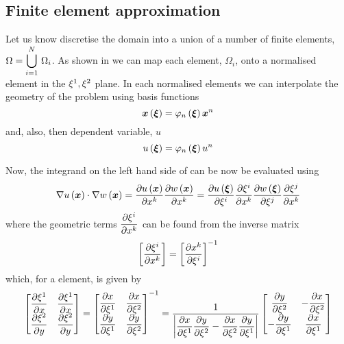 \subsection{Finite element approximation}
\label{subsec:FEMTwoDLaplaceFiniteElementApproximation}

Let us know discretise the domain into a union of a number of finite
elements, $\Omega =   \displaystyle\bigcup _{i=1}^{N}\,\Omega_{i} $. As shown in
 we can map each element, $\Omega_{i}$, onto
a normalised element in the $\xi^{1},\xi^{2}$ plane. In each
normalised elements we can interpolate the geometry of the problem
using basis functions \ie
\begin{equation}
    \boldsymbol{x} \left(  \boldsymbol{\xi}  \right) =   \varphi_{n} \left(  \boldsymbol{\xi}  \right)   { \boldsymbol{x} }^{n} 
\end{equation}
and, also, then dependent variable, $u$ \ie
\begin{equation}
   u\left(  \boldsymbol{\xi}  \right) =   \varphi_{n} \left(  \boldsymbol{\xi}  \right)   {u}^{n} 
\end{equation}


Now, the integrand on the left hand side of  can be now be evaluated using
\begin{equation}
  \dotprod{\gradient{}{\fnof{u}{\vectr{x}}}}{\gradient{}{\fnof{w}{\vectr{x}}}}=
  \delby{\fnof{u}{\vectr{x}}}{x^{k}}\delby{\fnof{w}{\vectr{x}}}{x^{k}}=
  \delby{\fnof{u}{\vectr{\xi}}}{\xi^{i}}\delby{\xi^{i}}{x^{k}}\delby{\fnof{w}{\vectr{\xi}}}{\xi^{j}}\delby{\xi^{j}}{x^{k}}
\end{equation}
where the geometric terms $ \dfrac{\partial \xi^{i}}{\partial x^{k}} $ can be found from
the inverse matrix
\begin{equation}
  \left[  \dfrac{\partial \xi^{i}}{\partial x^{k}}  \right]= {\left[  \dfrac{\partial x^{k}}{\partial \xi^{i}}  \right]}^{-1} 
\end{equation}
which, for a \twodal element, is given by
\begin{equation}
  \begin{bmatrix}
     \dfrac{\partial \xi^{1}}{\partial x}  &  \dfrac{\partial \xi^{1}}{\partial x}  \\
     \dfrac{\partial \xi^{2}}{\partial y}  &  \dfrac{\partial \xi^{2}}{\partial y} 
  \end{bmatrix} =  { \begin{bmatrix}
     \dfrac{\partial x}{\partial \xi^{1}}  &  \dfrac{\partial x}{\partial \xi^{2}}  \\
     \dfrac{\partial y}{\partial \xi^{1}}  &  \dfrac{\partial y}{\partial \xi^{2}} 
  \end{bmatrix}}^{-1} =\dfrac{1}{\left|  \dfrac{\partial x}{\partial \xi^{1}}  \dfrac{\partial y}{\partial \xi^{2}} - \dfrac{\partial x}{\partial \xi^{2}}  \dfrac{\partial y}{\partial \xi^{1}}  \right|}
  \begin{bmatrix}
     \dfrac{\partial y}{\partial \xi^{2}}  & - \dfrac{\partial x}{\partial \xi^{2}}  \\
    - \dfrac{\partial y}{\partial \xi^{1}}  &  \dfrac{\partial x}{\partial \xi^{1}}     
  \end{bmatrix}
\end{equation}

